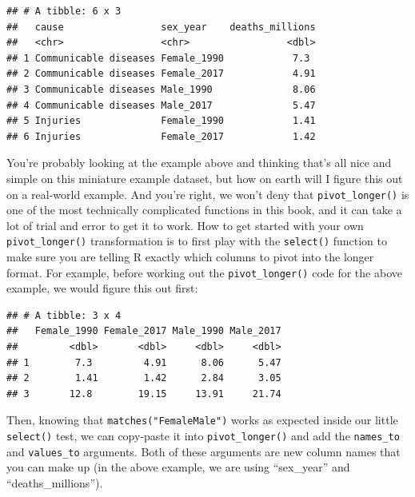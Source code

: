\documentclass[
  12pt,
  krantz2]{krantz}
\makeatletter
\newenvironment{Shaded}{\begin{snugshade}}{\end{snugshade}}
\newcommand{\KeywordTok}[1]{\textcolor[rgb]{0.13,0.29,0.53}{\textbf{#1}}}
\newcommand{\NormalTok}[1]{#1}
\newcommand{\OperatorTok}[1]{\textcolor[rgb]{0.81,0.36,0.00}{\textbf{#1}}}
\newcommand{\StringTok}[1]{\textcolor[rgb]{0.31,0.60,0.02}{#1}}
\newenvironment{kframe}{%
\medskip{}
\setlength{\fboxsep}{.8em}
 \def\at@end@of@kframe{}%
 \ifinner\ifhmode%
  \def\at@end@of@kframe{\end{minipage}}%
  \begin{minipage}{\columnwidth}%
 \fi\fi%
 \def\FrameCommand##1{\hskip\@totalleftmargin \hskip-\fboxsep
 \colorbox{shadecolor}{##1}\hskip-\fboxsep
     \hskip-\linewidth \hskip-\@totalleftmargin \hskip\columnwidth}%
 \MakeFramed {\advance\hsize-\width
   \@totalleftmargin\z@ \linewidth\hsize
   \@setminipage}}%
 {\par\unskip\endMakeFramed%
 \at@end@of@kframe}
\renewenvironment{Shaded}{\begin{kframe}}{\end{kframe}}
\makeatother
\begin{document}
\begin{verbatim}
## # A tibble: 6 x 3
##   cause                 sex_year    deaths_millions
##   <chr>                 <chr>                 <dbl>
## 1 Communicable diseases Female_1990            7.3 
## 2 Communicable diseases Female_2017            4.91
## 3 Communicable diseases Male_1990              8.06
## 4 Communicable diseases Male_2017              5.47
## 5 Injuries              Female_1990            1.41
## 6 Injuries              Female_2017            1.42
\end{verbatim}

You're probably looking at the example above and thinking that's all nice and simple on this miniature example dataset, but how on earth will I figure this out on a real-world example.
And you're right, we won't deny that \texttt{pivot\_longer()} is one of the most technically complicated functions in this book, and it can take a lot of trial and error to get it to work.
How to get started with your own \texttt{pivot\_longer()} transformation is to first play with the \texttt{select()} function to make sure you are telling R exactly which columns to pivot into the longer format.
For example, before working out the \texttt{pivot\_longer()} code for the above example, we would figure this out first:

\begin{Shaded}
\end{Shaded}

\begin{verbatim}
## # A tibble: 3 x 4
##   Female_1990 Female_2017 Male_1990 Male_2017
##         <dbl>       <dbl>     <dbl>     <dbl>
## 1        7.3         4.91      8.06      5.47
## 2        1.41        1.42      2.84      3.05
## 3       12.8        19.15     13.91     21.74
\end{verbatim}

Then, knowing that \texttt{matches("Female\textbar{}Male")} works as expected inside our little \texttt{select()} test, we can copy-paste it into \texttt{pivot\_longer()} and add the \texttt{names\_to} and \texttt{values\_to} arguments. Both of these arguments are new column names that you can make up (in the above example, we are using ``sex\_year'' and ``deaths\_millions'').
\end{document}
